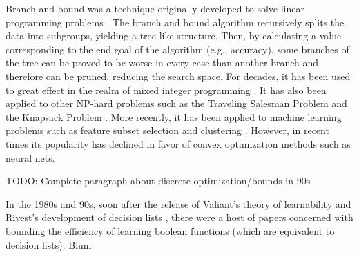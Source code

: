 Branch and bound was a technique originally developed to solve linear programming problems \cite{LandDo60}.
The branch and bound algorithm recursively splits the data into subgroups, yielding a tree-like structure.
Then, by calculating a value corresponding to the end goal of the algorithm (e.g., accuracy), some branches of the tree can be proved to be worse in every case than another branch and therefore can be pruned, reducing the search space.
For decades, it has been used to great effect in the realm of mixed integer programming \cite{LinderothSa99}.
It has also been applied to other NP-hard problems such as the Traveling Salesman Problem \cite{LittleMuSwKa63} and the Knapsack Problem \cite{Kolesar67}.
More recently, it has been applied to machine learning problems such as feature subset selection \cite{NarendraFu77} and clustering \cite{NarendraFu75}.
However, in recent times its popularity has declined in favor of convex optimization methods such as neural nets.

TODO: Complete paragraph about discrete optimization/bounds in 90s

In the 1980s and 90s, soon after the release of Valiant's theory of learnability \cite{Valiant84} and Rivest's development of decision lists \cite{Rivest87}, there were a host of papers concerned with bounding the efficiency of learning boolean functions (which are equivalent to decision lists).
Blum \cite{Blum90}
\cite{DhagatHe94}